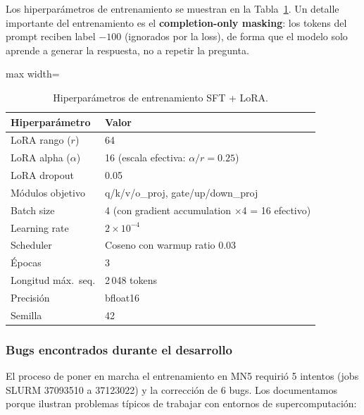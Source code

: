 \documentclass[11pt,a4paper]{article}
\begin{document}
Los hiperpar\'ametros de entrenamiento se muestran en la
Tabla~\ref{tab:hparams}. Un detalle importante del entrenamiento es el
\textbf{completion-only masking}: los tokens del prompt reciben label
$-100$ (ignorados por la loss), de forma que el modelo solo aprende a
generar la respuesta, no a repetir la pregunta.

\begin{table}[H]
\centering
\caption{Hiperpar\'ametros de entrenamiento SFT + LoRA.}
\label{tab:hparams}
\begin{adjustbox}{max width=\textwidth}
\begin{tabular}{@{}ll@{}}
\toprule
\textbf{Hiperpar\'ametro} & \textbf{Valor} \\
\midrule
LoRA rango ($r$)        & 64 \\
LoRA alpha ($\alpha$)   & 16 \quad (escala efectiva: $\alpha/r = 0.25$) \\
LoRA dropout            & 0.05 \\
M\'odulos objetivo      & q/k/v/o\_proj, gate/up/down\_proj \\
Batch size              & 4 (con gradient accumulation $\times$4 = 16 efectivo) \\
Learning rate           & $2 \times 10^{-4}$ \\
Scheduler               & Coseno con warmup ratio 0.03 \\
\'Epocas                & 3 \\
Longitud m\'ax.\ seq.  & 2\,048 tokens \\
Precisi\'on             & bfloat16 \\
Semilla                 & 42 \\
\bottomrule
\end{tabular}
\end{adjustbox}
\end{table}

\subsubsection{Bugs encontrados durante el desarrollo}

El proceso de poner en marcha el entrenamiento en MN5 requiri\'o
5 intentos (jobs SLURM 37093510 a 37123022) y la correcci\'on de 6
bugs. Los documentamos porque ilustran problemas t\'ipicos de trabajar
con entornos de supercomputaci\'on:
\end{document}
